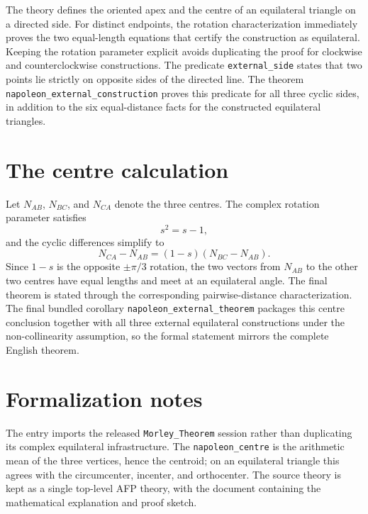 \documentclass[11pt,a4paper]{article}
\begin{document}
The theory defines the oriented apex and the centre of an equilateral triangle
on a directed side.  For distinct endpoints, the rotation characterization
immediately proves the two equal-length equations that certify the
construction as equilateral.  Keeping the rotation parameter explicit avoids
duplicating the proof for clockwise and counterclockwise constructions.
The predicate \texttt{external\_side} states that two points lie strictly on
opposite sides of the directed line.  The theorem
\texttt{napoleon\_external\_construction} proves this predicate for all three
cyclic sides, in addition to the six equal-distance facts for the constructed
equilateral triangles.

\section{The centre calculation}

Let \(N_{AB}\), \(N_{BC}\), and \(N_{CA}\) denote the three centres.  The
complex rotation parameter satisfies
\[
  s^2=s-1,
\]
and the cyclic differences simplify to
\[
  N_{CA}-N_{AB}=(1-s)(N_{BC}-N_{AB}).
\]
Since \(1-s\) is the opposite \(\pm\pi/3\) rotation, the two vectors from
\(N_{AB}\) to the other two centres have equal lengths and meet at an
equilateral angle.  The final theorem is stated through the corresponding
pairwise-distance characterization.  The final bundled corollary
\texttt{napoleon\_external\_theorem} packages this centre conclusion together
with all three external equilateral constructions under the non-collinearity
assumption, so the formal statement mirrors the complete English theorem.

\section{Formalization notes}

The entry imports the released \texttt{Morley\_Theorem} session rather than
duplicating its complex equilateral infrastructure.  The \texttt{napoleon\_centre}
is the arithmetic mean of the three vertices, hence the centroid; on an
equilateral triangle this agrees with the circumcenter, incenter, and
orthocenter.  The source theory is kept as a single top-level AFP theory, with
the document containing the mathematical explanation and proof sketch.





\end{document}
